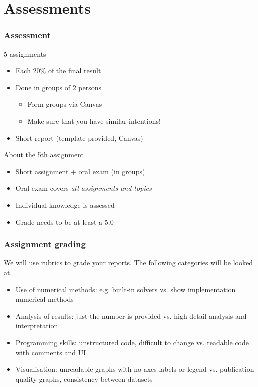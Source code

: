 \documentclass[11pt,table,final,fleqn,xcolor={usenames,dvipsnames},handout]{beamer}
\begin{document}
\section{Assessments}
\begin{frame}
 \frametitle{Assessment}
 \begin{block}{5 assignments}
  \begin{itemize}
    \item Each 20\% of the final result
    \item Done in groups of 2 persons
    \begin{itemize}
      \item Form groups via Canvas
      \item Make sure that you have similar intentions!
    \end{itemize}
    \item Short report (template provided, Canvas)
  \end{itemize}   
 \end{block}
 \pause
 \begin{block}{About the 5th assignment}
  \begin{itemize}
    \item Short assignment + oral exam (in groups)
    \item Oral exam covers \emph{all assignments and topics}
    \item Individual knowledge is assessed
    \item Grade needs to be at least a 5.0
  \end{itemize}   
 \end{block}
\end{frame} 
\begin{frame}
 \frametitle{Assignment grading}
 We will use rubrics to grade your reports. The following categories will be looked at. \pause
    \begin{itemize}[<+->]
    	\item Use of numerical methods: e.g. built-in solvers vs. show implementation numerical methods
    	\item Analysis of results: just the number is provided vs. high detail analysis and interpretation
    	\item Programming skills: unstructured code, difficult to change vs. readable code with comments and UI
    	\item Visualisation: unreadable graphs with no axes labels or legend vs. publication quality graphs, consistency between datasets
    \end{itemize} 
\end{frame}
\end{document}
